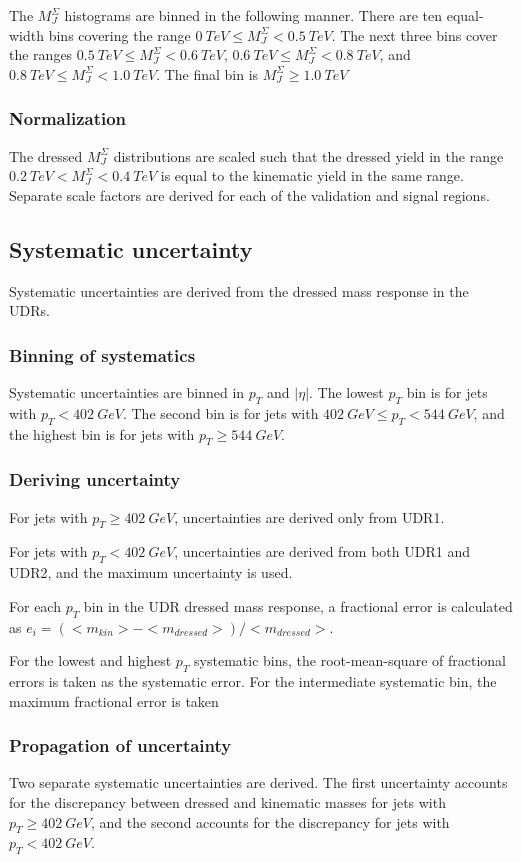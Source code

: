 The $M_{J}^{\Sigma}$ histograms are binned in the following
manner. There are ten equal-width bins covering the range $0~TeV \leq M_{J}^{\Sigma} <
0.5~TeV$. The next three bins cover the ranges $0.5~TeV \leq M_{J}^{\Sigma} <
0.6~TeV$, $0.6~TeV \leq M_{J}^{\Sigma} <
0.8~TeV$, and $0.8~TeV \leq M_{J}^{\Sigma} <
1.0~TeV$. The final bin is $M_{J}^{\Sigma} \geq
1.0~TeV$
\subsubsection{Normalization}
The dressed $M_{J}^{\Sigma}$ distributions are scaled such that the
dressed yield in the range  $0.2~TeV < M_{J}^{\Sigma} <
0.4~TeV$ is equal to the kinematic yield in the same range. Separate
scale factors are derived for each of the validation and signal regions.
\subsection{Systematic uncertainty}
Systematic uncertainties are derived from the dressed mass response in
the UDRs.
\subsubsection{Binning of systematics}
Systematic uncertainties are binned in $p_{T}$ and $|\eta|$. The lowest
$p_{T}$ bin is for jets with $p_{T} < 402~GeV$. The second bin is for
jets with $402~GeV \leq p_T
< 544~GeV$, and the highest bin is for jets with $p_T \geq 544~GeV$.
\subsubsection{Deriving uncertainty}
For jets with $p_{T} \geq 402~GeV$, uncertainties are derived only
from UDR1.

For jets with $p_{T} < 402~GeV$, uncertainties are derived from both
UDR1 and UDR2, and the maximum uncertainty is used.

For each $p_T$ bin in the UDR dressed mass response, a fractional
error is calculated as
$e_i=\left(<m_{kin}>-<m_{dressed}>\right)/<m_{dressed}>$.

For the lowest and highest $p_T$ systematic bins, the root-mean-square
of fractional errors is taken as the systematic error. For the
intermediate systematic bin, the maximum fractional error is taken

\subsubsection{Propagation of uncertainty}
Two separate systematic uncertainties are derived. The first
uncertainty accounts for the discrepancy between dressed and kinematic
masses for jets with $p_T \geq 402~GeV$, and the second accounts for the
discrepancy for jets with $p_T < 402~GeV$.

